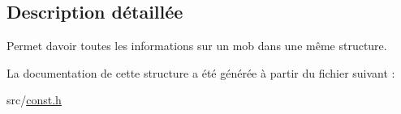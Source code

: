 \subsection{Description détaillée}
Permet d\textquotesingle{}avoir toutes les informations sur un mob dans une même structure. 

La documentation de cette structure a été générée à partir du fichier suivant \+:\begin{DoxyCompactItemize}
\item 
src/\hyperlink{const_8h}{const.\+h}\end{DoxyCompactItemize}
